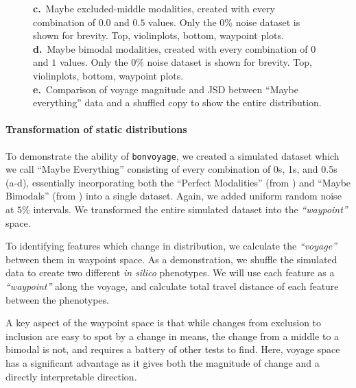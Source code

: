 \begin{figure}
{\textbf{c.}~Maybe excluded-middle modalities, created with every combination of $0.0$ and $0.5$ values. Only the 0\% noise dataset is shown for brevity. Top, violinplots, bottom, waypoint plots.\\
\textbf{d.}~Maybe bimodal modalities, created with every combination of $0$ and $1$ values. Only the 0\% noise dataset is shown for brevity. Top, violinplots, bottom, waypoint plots.\\
\textbf{e.}~Comparison of voyage magnitude and JSD between ``Maybe everything'' data and a shuffled copy to show the entire distribution.
}
\label{fig:bonvoyage_simulations}
\end{figure}



\paragraph{Transformation of static distributions}

To demonstrate the ability of \texttt{bonvoyage}, we created a simulated dataset which we call ``Maybe Everything'' consisting of every combination of 0s, 1s, and 0.5s (a-d), essentially incorporating both the ``Perfect Modalities'' (from ) and ``Maybe Bimodals'' (from ) into a single dataset. Again, we added uniform random noise at $5\%$ intervals. We transformed the entire simulated dataset into the \emph{``waypoint''} space.


To identifying features which change in distribution, we calculate the \emph{``voyage''} between them in waypoint space. As a demonstration, we shuffle the simulated data to create two different \emph{in silico} phenotypes. We will use each feature as a \emph{``waypoint''} along the voyage, and calculate total travel distance of each feature between the phenotypes.


A key aspect of the waypoint space is that while changes from exclusion to inclusion are easy to spot by a change in means, the change from a middle to a bimodal is not, and requires a battery of other tests to find. Here, voyage space has a significant advantage as it gives both the magnitude of change and a directly interpretable direction.


